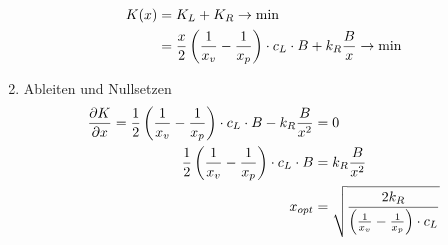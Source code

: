 \documentclass{article}
\begin{document}
\begin{enumerate}[label=(\alph*)]
\begin{align}
			K(x) &= K_L + K_R \to\min \notag \\
			&= \frac{x}{2}\left(\frac{1}{x_v}-\frac{1}{x_p}\right)\cdot c_L\cdot B + k_R\frac{B}{x} \to\min \notag
		\end{align}
		\item Ableiten und Nullsetzen
		\begin{align}
			\frac{\partial K}{\partial x} = \frac{1}{2}\left(\frac{1}{x_v}-\frac{1}{x_p}\right)\cdot c_L\cdot B - k_R\frac{B}{x^2} &= 0 \notag \\
			\frac{1}{2}\left(\frac{1}{x_v}-\frac{1}{x_p}\right)\cdot c_L\cdot B &= k_R\frac{B}{x^2} \notag \\
			x_{opt} &= \sqrt{\frac{2k_R}{\left(\frac{1}{x_v}-\frac{1}{x_p}\right)\cdot c_L}} \notag
		\end{align}
	\end{enumerate}
	
\end{document}
